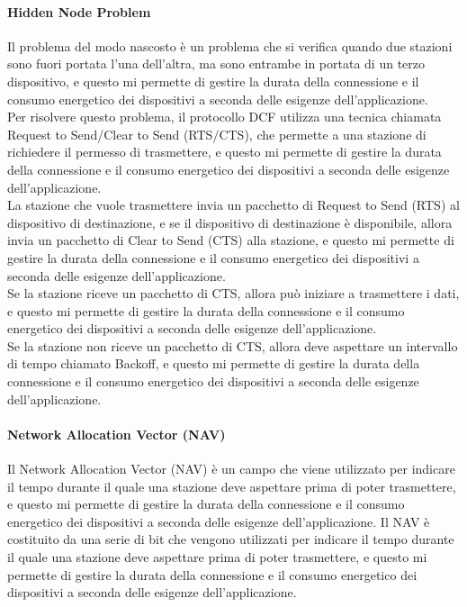 \paragraph{Hidden Node Problem}
Il problema del modo nascosto è un problema che si verifica quando due stazioni sono fuori portata l'una dell'altra, ma sono entrambe in portata di un terzo dispositivo, e questo mi permette di gestire la durata della connessione e il consumo energetico dei dispositivi a seconda delle esigenze dell'applicazione.\\
Per risolvere questo problema, il protocollo DCF utilizza una tecnica chiamata Request
to Send/Clear to Send (RTS/CTS), che permette a una stazione di richiedere il permesso di trasmettere, e questo mi permette di gestire la durata della connessione e il consumo energetico dei dispositivi a seconda delle esigenze dell'applicazione.\\
La stazione che vuole trasmettere invia un pacchetto di Request to Send (RTS) al dispositivo di destinazione, e se il dispositivo di destinazione è disponibile, allora invia un pacchetto di Clear to Send (CTS) alla stazione, e questo mi permette di gestire la durata della connessione e il consumo energetico dei dispositivi a seconda delle esigenze dell'applicazione.\\
Se la stazione riceve un pacchetto di CTS, allora può iniziare a trasmettere i dati, e questo mi permette di gestire la durata della connessione e il consumo energetico dei dispositivi a seconda delle esigenze dell'applicazione.\\
Se la stazione non riceve un pacchetto di CTS, allora deve aspettare un intervallo di tempo chiamato Backoff, e questo mi permette di gestire la durata della connessione e il consumo energetico dei dispositivi a seconda delle esigenze dell'applicazione.\\

\paragraph{Network Allocation Vector (NAV)}
Il Network Allocation Vector (NAV) è un campo che viene utilizzato per indicare il tempo durante il quale una stazione deve aspettare prima di poter trasmettere, e questo mi permette di gestire la durata della connessione e il consumo energetico dei dispositivi a seconda delle esigenze dell'applicazione. Il NAV è costituito da una serie di bit che vengono utilizzati per indicare il tempo durante il quale una stazione deve aspettare prima di poter trasmettere, e questo mi permette di gestire la durata della connessione e il consumo energetico dei dispositivi a seconda delle esigenze dell'applicazione.\\


